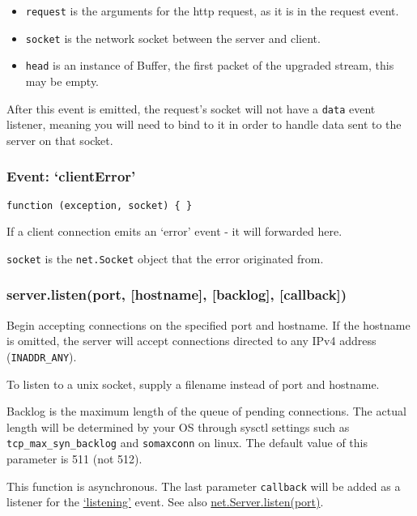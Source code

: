 \begin{itemize}
\itemsep1pt\parskip0pt
\item
  \texttt{request} is the arguments for the http request, as it is in
  the request event.
\item
  \texttt{socket} is the network socket between the server and client.
\item
  \texttt{head} is an instance of Buffer, the first packet of the
  upgraded stream, this may be empty.
\end{itemize}

After this event is emitted, the request's socket will not have a
\texttt{data} event listener, meaning you will need to bind to it in
order to handle data sent to the server on that socket.

\subsubsection{Event: `clientError'}\label{event-clienterror}

\texttt{function (exception, socket) \{ \}}

If a client connection emits an `error' event - it will forwarded here.

\texttt{socket} is the \texttt{net.Socket} object that the error
originated from.

\subsubsection{server.listen(port, {[}hostname{]}, {[}backlog{]},
{[}callback{]})}\label{server.listenport-hostname-backlog-callback}

Begin accepting connections on the specified port and hostname. If the
hostname is omitted, the server will accept connections directed to any
IPv4 address (\texttt{INADDR\_ANY}).

To listen to a unix socket, supply a filename instead of port and
hostname.

Backlog is the maximum length of the queue of pending connections. The
actual length will be determined by your OS through sysctl settings such
as \texttt{tcp\_max\_syn\_backlog} and \texttt{somaxconn} on linux. The
default value of this parameter is 511 (not 512).

This function is asynchronous. The last parameter \texttt{callback} will
be added as a listener for the
\href{net.html\#net_event_listening}{`listening'} event. See also
\href{net.html\#net_server_listen_port_host_backlog_callback}{net.Server.listen(port)}.

